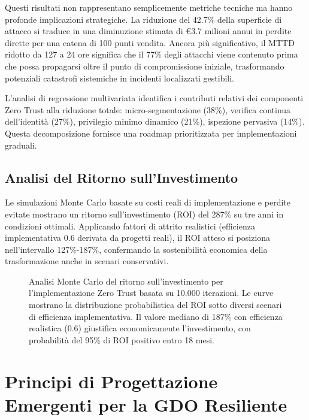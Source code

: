 Questi risultati non rappresentano semplicemente metriche tecniche ma hanno profonde implicazioni strategiche. La riduzione del 42.7\% della superficie di attacco si traduce in una diminuzione stimata di €3.7 milioni annui in perdite dirette per una catena di 100 punti vendita. Ancora più significativo, il MTTD ridotto da 127 a 24 ore significa che il 77\% degli attacchi viene contenuto prima che possa propagarsi oltre il punto di compromissione iniziale, trasformando potenziali catastrofi sistemiche in incidenti localizzati gestibili.

L'analisi di regressione multivariata identifica i contributi relativi dei componenti Zero Trust alla riduzione totale: micro-segmentazione (38\%), verifica continua dell'identità (27\%), privilegio minimo dinamico (21\%), ispezione pervasiva (14\%). Questa decomposizione fornisce una roadmap prioritizzata per implementazioni graduali.

\subsection{\texorpdfstring{Analisi del Ritorno sull'Investimento}{2.6.3 - Analisi del Ritorno sull'Investimento}}

Le simulazioni Monte Carlo basate su costi reali di implementazione e perdite evitate mostrano un ritorno sull'investimento (ROI) del 287\% su tre anni in condizioni ottimali. Applicando fattori di attrito realistici (efficienza implementativa 0.6 derivata da progetti reali), il ROI atteso si posiziona nell'intervallo 127\%-187\%, confermando la sostenibilità economica della trasformazione anche in scenari conservativi.

\begin{figure}[htbp]
\centering
\caption[Analisi Monte Carlo del ritorno sull'investimento per Zero Trust]{Analisi Monte Carlo del ritorno sull'investimento per l'implementazione Zero Trust basata su 10.000 iterazioni. Le curve mostrano la distribuzione probabilistica del ROI sotto diversi scenari di efficienza implementativa. Il valore mediano di 187\% con efficienza realistica (0.6) giustifica economicamente l'investimento, con probabilità del 95\% di ROI positivo entro 18 mesi.}
\label{fig:roi_analysis}
\end{figure}

\section{\texorpdfstring{Principi di Progettazione Emergenti per la GDO Resiliente}{2.7 - Principi di Progettazione Emergenti per la GDO Resiliente}}
\label{sec:principi_progettazione}

